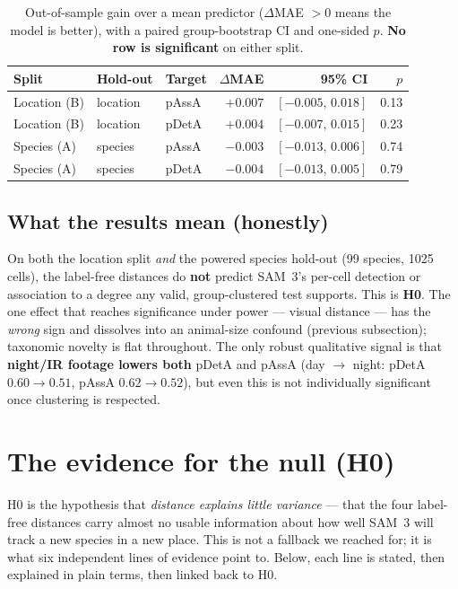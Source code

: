 \documentclass[11pt]{article}
\newcommand{\pdeta}{\textsf{pDetA}}
\newcommand{\passa}{\textsf{pAssA}}
\begin{document}
\begin{table}[h]
\centering
\small
\begin{tabular}{lllrrr}
\toprule
Split & Hold-out & Target & $\Delta$MAE & 95\% CI & $p$ \\
\midrule
Location (B) & location & \passa{} & $+0.007$ & $[-0.005,\,0.018]$ & 0.13 \\
Location (B) & location & \pdeta{} & $+0.004$ & $[-0.007,\,0.015]$ & 0.23 \\
Species (A)  & species  & \passa{} & $-0.003$ & $[-0.013,\,0.006]$ & 0.74 \\
Species (A)  & species  & \pdeta{} & $-0.004$ & $[-0.013,\,0.005]$ & 0.79 \\
\bottomrule
\end{tabular}
\caption{Out-of-sample gain over a mean predictor ($\Delta$MAE $>0$ means the model is better), with a
paired group-bootstrap CI and one-sided $p$. \textbf{No row is significant} on either split.}
\label{tab:cv}
\end{table}

\subsection{What the results mean (honestly)}
On both the location split \emph{and} the powered species hold-out (99 species, 1025 cells), the label-free
distances do \textbf{not} predict SAM~3's per-cell detection or association to a degree any valid,
group-clustered test supports. This is \textbf{H0}. The one effect that reaches significance under power ---
visual distance --- has the \emph{wrong} sign and dissolves into an animal-size confound (previous
subsection); taxonomic novelty is flat throughout. The only robust qualitative signal is that
\textbf{night/IR footage lowers both} \pdeta{} and \passa{} (day $\to$ night: \pdeta{} $0.60\to0.51$,
\passa{} $0.62\to0.52$), but even this is not individually significant once clustering is respected.

\section{The evidence for the null (H0)}
H0 is the hypothesis that \emph{distance explains little variance} --- that the four label-free distances
carry almost no usable information about how well SAM~3 will track a new species in a new place. This is
not a fallback we reached for; it is what six independent lines of evidence point to. Below, each line is
stated, then explained in plain terms, then linked back to H0.
\end{document}
